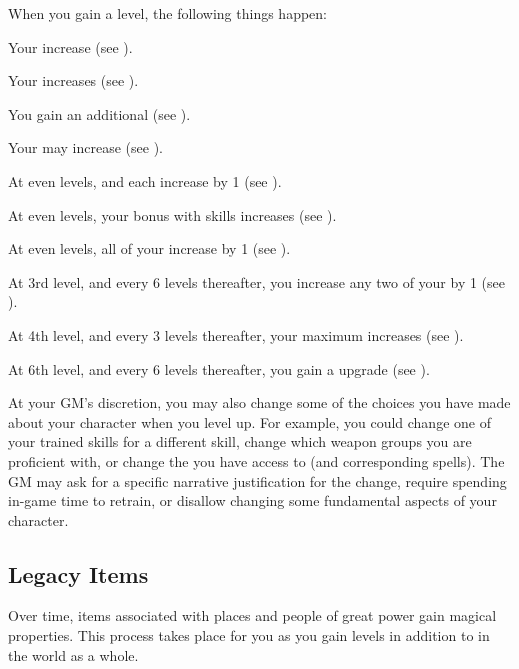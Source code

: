    When you gain a level, the following things happen:
    \begin{raggeditemize}
        \item Your  increase (see ).
        \item Your  increases (see ).
        \item You gain an additional  (see ).
        \item Your  may increase (see ).
        \item At even levels,  and  each increase by 1 (see ).
        \item At even levels, your bonus with  skills increases (see ).
        \item At even levels, all of your  increase by 1 (see ).
        \item At 3rd level, and every 6 levels thereafter, you increase any two of your  by 1 (see ).
        \item At 4th level, and every 3 levels thereafter, your maximum  increases (see ).
        \item At 6th level, and every 6 levels thereafter, you gain a  upgrade (see ).
    \end{raggeditemize}

    At your GM's discretion, you may also change some of the choices you have made about your character when you level up.
    For example, you could change one of your trained skills for a different skill, change which weapon groups you are proficient with, or change the  you have access to (and corresponding spells).
    The GM may ask for a specific narrative justification for the change, require spending in-game time to retrain, or disallow changing some fundamental aspects of your character.

    \subsection{Legacy Items}\label{Legacy Items}

        Over time, items associated with places and people of great power gain magical properties.
        This process takes place for you as you gain levels in addition to in the world as a whole.

